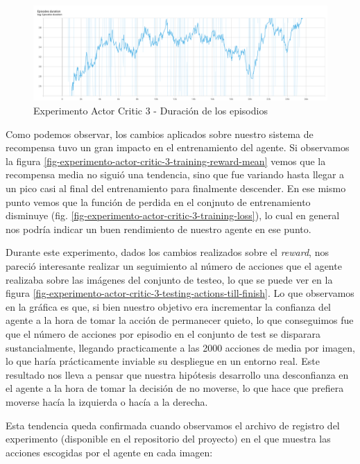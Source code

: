 \begin{figure}[H]
	\centering
	\includegraphics[width=1\textwidth]{figuras/experiments/actor_critic/reward_2_rew_by_two_stop_with_none/episodes_duration.png}
	\caption[Experimento Actor Critic 3 - Duración de los episodios]{Experimento Actor Critic 3 - Duración de los episodios}
	\label{fig-experimento-actor-critic-3-episodes-duration}
\end{figure}

Como podemos observar, los cambios aplicados sobre nuestro sistema de recompensa tuvo un gran impacto en el entrenamiento del agente. Si observamos la figura \ref{fig-experimento-actor-critic-3-training-reward-mean} vemos que la recompensa media no siguió una tendencia, sino que fue variando hasta llegar a un pico casi al final del entrenamiento para finalmente descender. En ese mismo punto vemos que la función de perdida en el conjnuto de entrenamiento disminuye (fig. \ref{fig-experimento-actor-critic-3-training-loss}), lo cual en general nos podría indicar un buen rendimiento de nuestro agente en ese punto.
\medskip

Durante este experimento, dados los cambios realizados sobre el \textit{reward}, nos pareció interesante realizar un seguimiento al número de acciones que el agente realizaba sobre las imágenes del conjunto de testeo, lo que se puede ver en la figura \ref{fig-experimento-actor-critic-3-testing-actions-till-finish}. Lo que observamos en la gráfica es que, si bien nuestro objetivo era incrementar la confianza del agente a la hora de tomar la acción de permanecer quieto, lo que conseguimos fue que el número de acciones por episodio en el conjunto de test se disparara sustancialmente, llegando practicamente a las 2000 acciones de media por imagen, lo que haría prácticamente inviable su despliegue en un entorno real. Este resultado nos lleva a pensar que nuestra hipótesis desarrollo una desconfianza en el agente a la hora de tomar la decisión de no moverse, lo que hace que prefiera moverse hacía la izquierda o hacía a la derecha.
\medskip

Esta tendencia queda confirmada cuando observamos el archivo de registro del experimento (disponible en el repositorio del proyecto) en el que muestra las acciones escogidas por el agente en cada imagen:

